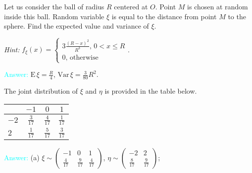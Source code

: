 \documentclass[14pt]{exam}
\def\Var{{\textrm{Var}}\,}
\def\E{{\textrm{E}}\,}
\begin{document}
\begin{questions}
		\question
		Let us consider the ball of radius $R$ centered at $O$. Point $M$ is chosen at random inside this ball. Random variable $\xi$ is equal to the distance from point $M$ to the sphere. Find the expected value and variance of $\xi$.
		
		\textit{Hint:} $f_\xi(x) = \begin{cases}
			3\frac{(R - x)^2}{R^3},\, 0 < x \leq R\\
			0,\, \text{otherwise}
		\end{cases}$.
		
		\textcolor{cyan}{Answer:} $\E\xi = \frac{R}{4}$, $\Var\xi = \frac{3}{80}R^2$.
		
		\question
		The joint distribution of $\xi$ and $\eta$ is provided in the table below.
		
		\begin{tabular}{|l|ccc|}
			\hline
			\diagbox{$\eta$}{$\xi$} & $-1$ & $0$ & $1$\\\hline
			$-2$ & $\frac{3}{17}$ & $\frac{4}{17}$ & $\frac{1}{17}$\\
			$2$ & $\frac{1}{17}$ & $\frac{5}{17}$ & $\frac{3}{17}$\\\hline
		\end{tabular}
		
		\textcolor{cyan}{Answer:} (a) $\xi \sim \begin{pmatrix}
			-1 & 0 & 1\\
			\frac{4}{17} & \frac{9}{17} & \frac{4}{17}
		\end{pmatrix}$, $\eta \sim \begin{pmatrix}
			-2 & 2\\
			\frac{8}{17} & \frac{9}{17}\end{pmatrix}$;
			

\end{questions}
\end{document}
